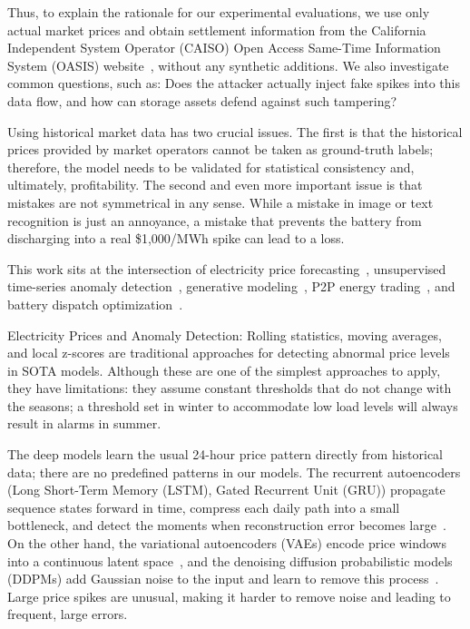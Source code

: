 \documentclass[journal]{IEEEtran}
\begin{document}
Thus, to explain the rationale for our experimental evaluations, we use only actual market prices and obtain settlement information from the California Independent System Operator (CAISO) Open Access Same-Time Information System (OASIS) website~\cite{CAISO}, without any synthetic additions. We also investigate common questions, such as: Does the attacker actually inject fake spikes into this data flow, and how can storage assets defend against such tampering?

Using historical market data has two crucial issues. The first is that the historical prices provided by market operators cannot be taken as ground-truth labels; therefore, the model needs to be validated for statistical consistency and, ultimately, profitability. The second and even more important issue is that mistakes are not symmetrical in any sense. While a mistake in image or text recognition is just an annoyance, a mistake that prevents the battery from discharging into a real \$1,000/MWh spike can lead to a loss.

This work sits at the intersection of electricity price forecasting~\cite{Lago_EPF_Benchmark}, unsupervised time-series anomaly detection~\cite{AE_Anomaly, Audibert_USAD}, generative modeling~\cite{VAE, DDPM}, P2P energy trading~\cite{Chen_DRL_BESS, P2P_Systems_Book}, and battery dispatch optimization~\cite{RL_Dispatch, Shi_BESS_Coopt, He_CAISO_BESS, Sutton_RL}.

Electricity Prices and Anomaly Detection:
Rolling statistics, moving averages, and local z-scores are traditional approaches for detecting abnormal price levels in SOTA models. Although these are one of the simplest approaches to apply, they have limitations: they assume constant thresholds that do not change with the seasons; a threshold set in winter to accommodate low load levels will always result in alarms in summer.

The deep models learn the usual 24-hour price pattern directly from historical data; there are no predefined patterns in our models. The recurrent autoencoders (Long Short-Term Memory (LSTM), Gated Recurrent Unit (GRU)) propagate sequence states forward in time, compress each daily path into a small bottleneck, and detect the moments when reconstruction error becomes large~\cite{Audibert_USAD}. On the other hand, the variational autoencoders (VAEs) encode price windows into a continuous latent space~\cite{VAE}, and the denoising diffusion probabilistic models (DDPMs) add Gaussian noise to the input and learn to remove this process~\cite{DDPM}. Large price spikes are unusual, making it harder to remove noise and leading to frequent, large errors.
\end{document}
